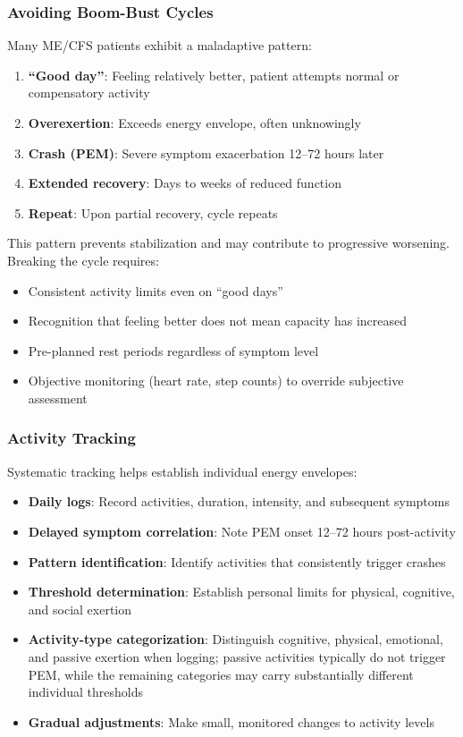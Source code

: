 \subsubsection{Avoiding Boom-Bust Cycles}

Many ME/CFS patients exhibit a maladaptive pattern:

\begin{enumerate}
    \item \textbf{``Good day''}: Feeling relatively better, patient attempts normal or compensatory activity
    \item \textbf{Overexertion}: Exceeds energy envelope, often unknowingly
    \item \textbf{Crash (PEM)}: Severe symptom exacerbation 12--72 hours later
    \item \textbf{Extended recovery}: Days to weeks of reduced function
    \item \textbf{Repeat}: Upon partial recovery, cycle repeats
\end{enumerate}

This pattern prevents stabilization and may contribute to progressive worsening. Breaking the cycle requires:

\begin{itemize}
    \item Consistent activity limits even on ``good days''
    \item Recognition that feeling better does not mean capacity has increased
    \item Pre-planned rest periods regardless of symptom level
    \item Objective monitoring (heart rate, step counts) to override subjective assessment
\end{itemize}

\subsubsection{Activity Tracking}

Systematic tracking helps establish individual energy envelopes:

\begin{itemize}
    \item \textbf{Daily logs}: Record activities, duration, intensity, and subsequent symptoms
    \item \textbf{Delayed symptom correlation}: Note PEM onset 12--72 hours post-activity
    \item \textbf{Pattern identification}: Identify activities that consistently trigger crashes
    \item \textbf{Threshold determination}: Establish personal limits for physical, cognitive, and social exertion
    \item \textbf{Activity-type categorization}: Distinguish cognitive, physical, emotional, and passive exertion when logging; passive activities typically do not trigger PEM, while the remaining categories may carry substantially different individual thresholds
    \item \textbf{Gradual adjustments}: Make small, monitored changes to activity levels
\end{itemize}

